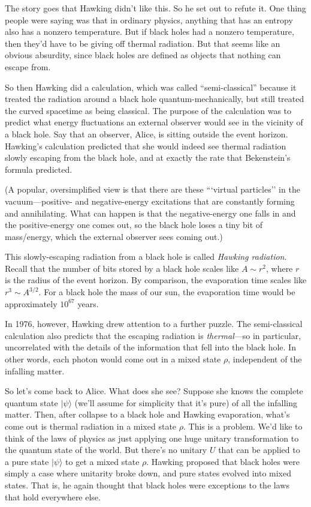 \documentclass[11pt]{report}
\theoremstyle{plain}
\theoremstyle{definition}
\renewcommand{\ket}[1]{|#1\rangle}
\begin{document}
The story goes that Hawking didn't like this. So he set out to refute it.
One thing people were saying was that in
ordinary physics, anything that has an entropy also has
a nonzero temperature.  But if black holes had a nonzero temperature,
then they'd have to be giving off
thermal radiation.  But that seems like an obvious absurdity, since
black holes are defined as objects that nothing can escape from.

So then Hawking
did a calculation, which was called ``semi-classical''
because it treated the radiation around a black hole quantum-mechanically, but still
treated the curved spacetime as being classical.  The purpose of the
calculation was to predict what energy fluctuations an external observer would see in the vicinity of a black hole.
Say that an observer, Alice, is sitting outside the event horizon.
Hawking's calculation predicted that she would indeed see thermal radiation
slowly escaping from the black hole, and at exactly the
rate that Bekenstein's formula predicted.

(A popular, oversimplified view is that there are these
```virtual particles'' in the vacuum---positive- and negative-energy excitations
that are constantly forming and annihilating.  What can happen is that the negative-energy one falls in and the positive-energy one comes out, so the
black hole loses a tiny bit of mass/energy, which the external observer
sees coming out.)

This slowly-escaping radiation from a black hole is
called {\em Hawking radiation}.
Recall that the number of bits stored by a black hole scales like $A \sim r^2$, where $r$ is the radius of the event horizon.
By comparison, the evaporation time scales like $r^3 \sim A^{3/2}$.  For a black hole the mass of our sun, the evaporation time
would be approximately $10^{67}$ years.

In 1976, however, Hawking drew attention to a further puzzle.
The semi-classical calculation also predicts that the escaping radiation
is {\em thermal}---so in particular, uncorrelated with the details of the information that fell into the
black hole.
In other words, each photon would come out in a mixed state $\rho$,
independent of the infalling matter.

So let's come back to Alice. What does she see? Suppose she knows the complete
quantum state %
$\ket{\psi}$ (we'll assume for simplicity that it's pure)
of all the infalling matter.  Then, after collapse to a black hole and Hawking evaporation,
what's come out is thermal radiation in a mixed state ${\rho}$.
This is a problem.
We'd like to think of the laws of physics as just applying one huge unitary transformation to the quantum
state of the world. But there's no unitary $U$
that can be applied to a pure state $\ket{\psi}$ to get a mixed state ${\rho}$.
Hawking proposed that black holes were simply a case where unitarity broke down, and pure states
evolved into mixed states.  That is, he again thought that
black holes were exceptions to the laws that hold everywhere else.
\end{document}
